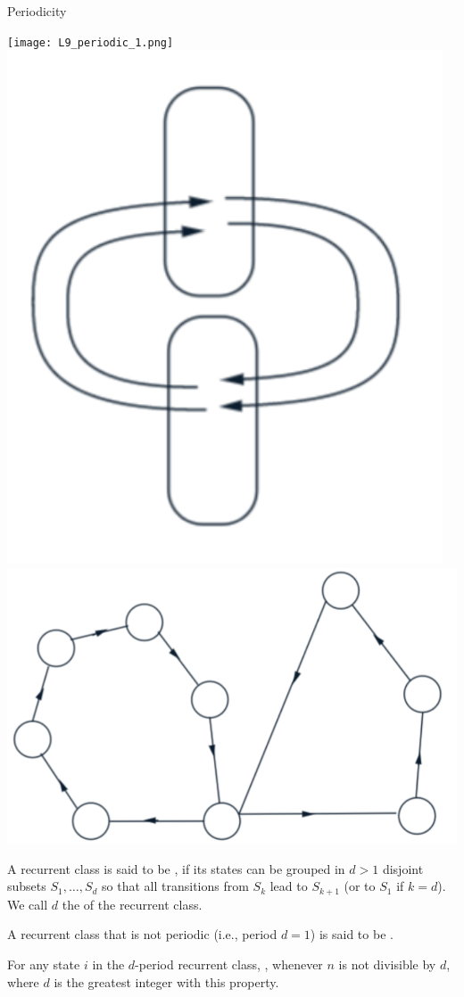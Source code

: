\begin{frame}{Periodicity}
  
  \centering
  \texttt{[image: L9\_periodic\_1.png]}
  \hspace{1cm}
  \includegraphics[width=0.2\columnwidth]{L9_periodic_2.png}
  \hspace{1cm}
  \includegraphics[width=0.28\columnwidth]{L9_periodic_3.png}


  \plitemsep 0.1in
  \bci
  
\item<2->  A recurrent class  is said to be , if
  its states can be grouped in $d >1$ disjoint subsets $S_1, \ldots,
  S_d$ so that all transitions from $S_k$ lead to $S_{k+1}$ (or to
  $S_1$ if $k=d$). We call $d$ the  of the recurrent class. 
  
  
  
\item<3-> A recurrent class that is not periodic (i.e., period $d=1$) is said to be
  .
  

\item<4-> For any state $i$ in the $d$-period recurrent class,
  , whenever $n$ is not divisible by $d$, where $d$ is the greatest
  integer with this property. 


  
  
  \eci
  
\end{frame}

